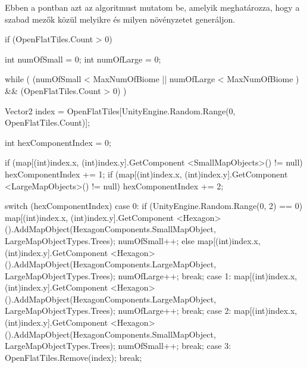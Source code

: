 Ebben a pontban azt az algoritmust mutatom be, amelyik meghatározza, hogy a szabad mezők közül melyikre és milyen növényzetet generáljon.
\begin{cpp}
if (OpenFlatTiles.Count > 0)
{
   int numOfSmall = 0;
   int numOfLarge = 0;

   while ( (numOfSmall < MaxNumOfBiome || numOfLarge < MaxNumOfBiome )
   && (OpenFlatTiles.Count > 0) )
   {
      Vector2 index = OpenFlatTiles[UnityEngine.Random.Range(0, 
      OpenFlatTiles.Count)];
                
      int hexComponentIndex = 0;

      if (map[(int)index.x, (int)index.y].GetComponent
      <SmallMapObjects>() != null)
      {
         hexComponentIndex += 1;
      }
      if (map[(int)index.x, (int)index.y].GetComponent
      <LargeMapObjects>() != null)
      {
         hexComponentIndex += 2;
      }

      switch (hexComponentIndex)
      {
         case 0:
            if (UnityEngine.Random.Range(0, 2) == 0)
            {
               map[(int)index.x, (int)index.y].GetComponent
               <Hexagon>().AddMapObject(HexagonComponents.SmallMapObject, 
               LargeMapObjectTypes.Trees);
               numOfSmall++;
            }
            else
            {
               map[(int)index.x, (int)index.y].GetComponent
               <Hexagon>().AddMapObject(HexagonComponents.LargeMapObject, 
               LargeMapObjectTypes.Trees);
               numOfLarge++;
            }
            break;
         case 1:
            map[(int)index.x, (int)index.y].GetComponent
            <Hexagon>().AddMapObject(HexagonComponents.LargeMapObject, 
            LargeMapObjectTypes.Trees);
            numOfLarge++;
            break;
         case 2:
            map[(int)index.x, (int)index.y].GetComponent
            <Hexagon>().AddMapObject(HexagonComponents.SmallMapObject, 
            LargeMapObjectTypes.Trees);
            numOfSmall++;
            break;
         case 3:
            OpenFlatTiles.Remove(index);
            break;
      }
   }
}
\end{cpp}
